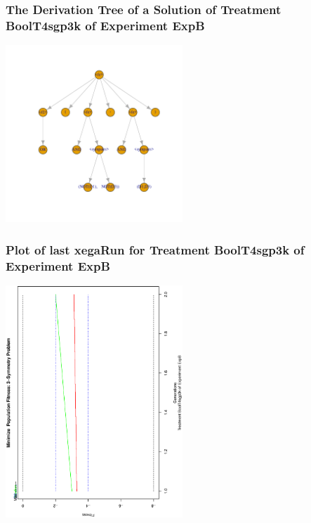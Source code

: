 \documentclass[18pt,c]{beamer}
\begin{document}
 \begin{frame}
 \frametitle{ The Derivation Tree of a Solution of Treatment BoolT4sgp3k of Experiment ExpB }
 \begin{center}
\includegraphics[width=0.5\textwidth, angle=0]
{ExpBDerivationTreeFigure021.pdf}
 \end{center}
 \label{report/ExpBDerivationTreeFigure021.pdf}  
 \end{frame}

 \begin{frame}
 \frametitle{ Plot of last xegaRun for Treatment BoolT4sgp3k of Experiment ExpB }
 \begin{center}
\includegraphics[width=0.5\textwidth, angle=-90]
{ExpBPlotPopStatsFigure021.eps}
 \end{center}
 \label{report/ExpBPlotPopStatsFigure021.eps}  
 \end{frame}
\end{document}
